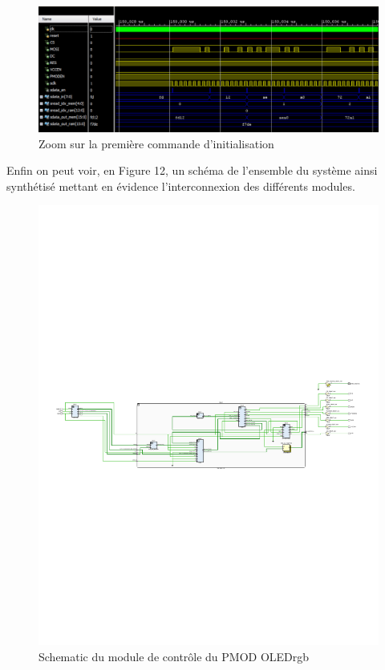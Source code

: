 \documentclass[11pt]{article}
\begin{document}
\begin{figure}[H]
\begin{center}
\includegraphics[scale = 0.3, keepaspectratio]{chrono_3}
\caption{Zoom sur la première commande d'initialisation}
\end{center}
\end{figure}

Enfin on peut voir, en Figure 12, un schéma de l'ensemble du système ainsi synthétisé mettant en évidence l'interconnexion des différents modules.

\begin{figure}[H]
\begin{center}
\includegraphics[scale = 1.95, keepaspectratio]{schematic}
\caption{Schematic du module de contrôle du PMOD OLEDrgb}
\end{center}
\end{figure}
\end{document}
